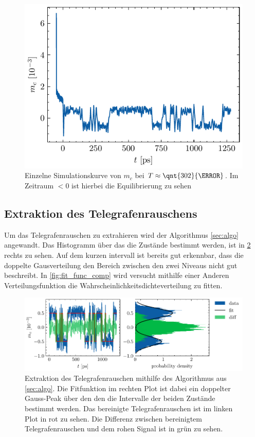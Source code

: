 \documentclass[main.tex]{subfiles}
\begin{document}
\begin{figure}[h]
    \centering
    \includegraphics{bilder/plots/theo-vis/example-telegraph-sim.pdf}
    \caption{Einzelne Simulationskurve von \(m_c\) bei \(T \approx \qnt{302}{\kelvin}\). Im Zeitraum \(<0\) ist hierbei die Equilibrierung zu sehen
    }\label{fig:bsp-run}
\end{figure}

\subsection{Extraktion des Telegrafenrauschens}

Um das Telegrafenrauschen zu extrahieren wird der Algorithmus \cref{sec:algo} angewandt.
Das Histogramm über das die Zustände bestimmt werden, ist in \cref{fig:extraktion-tgr} rechts zu sehen. Auf dem kurzen intervall ist bereits gut erkennbar, dass die doppelte Gausverteilung den Bereich zwischen den zwei Niveaus nicht gut beschreibt. In \cref{fig:fit_func_comp} wird versucht mithilfe einer Anderen Verteilungsfunktion die Wahrscheinlichkeitsdichteverteilung zu fitten.

\begin{figure}[H]
    \centering
    \includegraphics{bilder/plots/Bz_0mT/mc_fit_hist_part2_26.03meV.pdf}
    \caption{Extraktion des Telegrafenrauschen mithilfe des Algorithmus aus \cref{sec:algo}. Die Fitfunktion im rechten Plot ist dabei ein doppelter Gauss-Peak über den den die Intervalle der beiden Zustände bestimmt werden. Das bereinigte Telegrafenrauschen ist im linken Plot in rot zu sehen.  Die Differenz zwischen bereinigtem Telegrafenrauschen und dem rohen Signal ist in grün zu sehen.}\label{fig:extraktion-tgr}
\end{figure}
\end{document}

